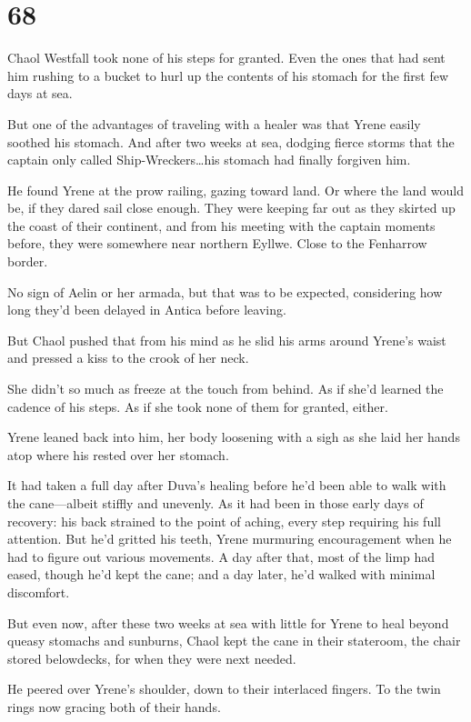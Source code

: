 
\chapter{68}

Chaol Westfall took none of his steps for granted.
Even the ones that had sent him rushing to a bucket to hurl up the contents of his stomach for the first few days at sea.

But one of the advantages of traveling with a healer was that Yrene easily soothed his stomach.
And after two weeks at sea, dodging fierce storms that the captain only called Ship-Wreckers\ldots his stomach had finally forgiven him.

He found Yrene at the prow railing, gazing toward land.
Or where the land would be, if they dared sail close enough.
They were keeping far out as they skirted up the coast of their continent, and from his meeting with the captain moments before, they were somewhere near northern Eyllwe.
Close to the Fenharrow border.

No sign of Aelin or her armada, but that was to be expected, considering how long they'd been delayed in Antica before leaving.

But Chaol pushed that from his mind as he slid his arms around Yrene's waist and pressed a kiss to the crook of her neck.

She didn't so much as freeze at the touch from behind.
As if she'd learned the cadence of his steps.
As if she took none of them for granted, either.

Yrene leaned back into him, her body loosening with a sigh as she laid her hands atop where his rested over her stomach.

It had taken a full day after Duva's healing before he'd been able to walk with the cane---albeit stiffly and unevenly.
As it had been in those early days of recovery: his back strained to the point of aching, every step requiring his full attention.
But he'd gritted his teeth, Yrene murmuring encouragement when he had to figure out various movements.
A day after that, most of the limp had eased, though he'd kept the cane; and a day later, he'd walked with minimal discomfort.

But even now, after these two weeks at sea with little for Yrene to heal beyond queasy stomachs and sunburns, Chaol kept the cane in their stateroom, the chair stored belowdecks, for when they were next needed.

He peered over Yrene's shoulder, down to their interlaced fingers.
To the twin rings now gracing both of their hands.

